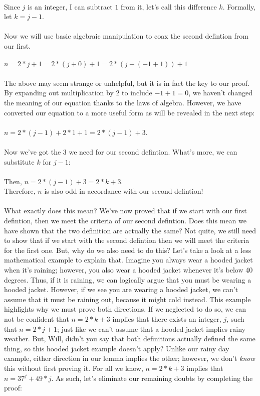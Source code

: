 \documentclass[a4paper,12pt]{article}
\begin{document}
\\
Since $j$ is an integer, I can subtract $1$ from it, let's call this difference $k$. Formally, let $k = j - 1$.\\
\\
Now we will use basic algebraic manipulation to coax the second defintion from our first.\\
\\
$n = 2*j + 1 = 2*(j + 0) + 1 = 2*(j + (-1 + 1)) + 1$\\
\\
The above may seem strange or unhelpful, but it is in fact the key to our proof. By expanding out multiplication by 2 to include $-1 + 1 = 0$, we haven't changed the meaning of our equation thanks to the laws of algebra. However, we have converted our equation to a more useful form as will be revealed in the next step:\\
\\
$n = 2*(j - 1) + 2*1 + 1 = 2*(j - 1) + 3$.\\
\\
Now we've got the $3$ we need for our second defintion. What's more, we can substitute $k$ for $j - 1$:\\
\\
Then, $n = 2*(j - 1) + 3 = 2*k + 3$.\\
Therefore, $n$ is also odd in accordance with our second defintion!\\
\\
What exactly does this mean? We've now proved that if we start with our first defintion, then we meet the criteria of our second defintion. Does this mean we have shown that the two definition are actually the same? Not quite, we still need to show that if we start with the second defintion then we will meet the criteria for the first one. But, why do we also need to do this? Let's take a look at a less mathematical example to explain that. Imagine you always wear a hooded jacket when it's raining; however, you also wear a hooded jacket whenever it's below 40 degrees. Thus, if it is raining, we can logically argue that you must be wearing a hooded jacket. However, if we see you are wearing a hooded jacket, we can't assume that it must be raining out, because it might cold instead. This example highlights why we must prove both directions. If we neglected to do so, we can not be confident that $n = 2*k + 3$ implies that there exists an integer, $j$, such that $n = 2*j + 1$; just like we can't assume that a hooded jacket implies rainy weather. But, Will, didn't you say that both definitions actually defined the same thing, so this hooded jacket example doesn't apply? Unlike our rainy day example, either direction in our lemma implies the other; however, we don't \textit{know} this without first proving it. For all we know, $n = 2*k + 3$ implies that $n = 37^j + 49*j$. As such, let's eliminate our remaining doubts by completing the proof:\\
\end{document}

